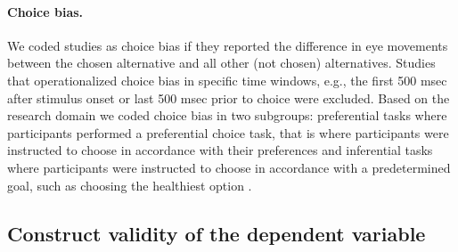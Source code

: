 \documentclass{article}
\begin{document}
\paragraph{Choice bias.} We coded studies as choice bias if they reported the difference in eye movements between the chosen alternative and all other (not chosen) alternatives. Studies that operationalized choice bias in specific time windows, e.g., the first 500 msec after stimulus onset or last 500 msec prior to choice \citep{shimojo2003a} were excluded. Based on the research domain we coded choice bias in two subgroups: preferential tasks where participants performed a preferential choice task, that is where participants were instructed to choose in accordance with their preferences \citep{schotter2010a} and inferential tasks where participants were instructed to choose in accordance with a predetermined goal, such as choosing the healthiest option \citep{schotter2012a}.


\subsection{Construct validity of the dependent variable}
\end{document}
